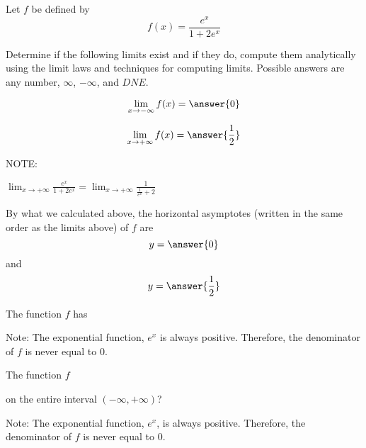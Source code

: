 \documentclass{ximera}
\author{Nela Lakos}
\begin{document}
\begin{exercise}

Let $f$ be defined by
\[
f(x) = \frac{e^x}{1+2e^x}
\]


Determine if the following limits exist and if they do, compute them analytically using the limit laws and techniques for computing limits.  Possible answers are any number, $\infty$, $-\infty$, and $DNE$.

\begin{exercise}
\[
\lim_{x\to-\infty}f(x) = \answer{0}
\]
\begin{exercise}
\[
\lim_{x\to+\infty}f(x) = \answer{\frac{1}{2}}
\]
\begin{hint}
NOTE: 

$\lim_{x\to+\infty}\frac{e^x}{1+2e^x} =\lim_{x\to+\infty }\frac{1}{\frac{1}{e^x}+2}$

\end{hint}
\end{exercise}
\end{exercise}



\begin{exercise}
By what we calculated above, the horizontal asymptotes (written in the same order as the limits above) of $f$ are 
\[
y=\answer{0}
\]
and
\[
y=\answer{\frac{1}{2}}
\]
\end{exercise}

\begin{exercise}
The function $f$ has
\begin{multipleChoice}
\end{multipleChoice}
\begin{hint}
Note: The exponential function, $e^x$ is always positive. Therefore, the denominator of $f$ is never equal to $0$. 
\end{hint}
\end{exercise}
\begin{exercise}
The function $f$ 
\begin{multipleChoice}
\end{multipleChoice}
 on the  entire interval $(-\infty,+\infty)$?

\begin{hint}
Note: The exponential function, $e^x$, is always positive. Therefore, the denominator of $f$ is never equal to $0$. 
\end{hint}
\end{exercise}
\end{exercise}
\end{document}
